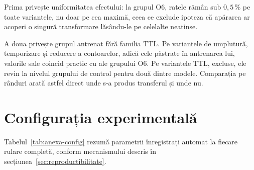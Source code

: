 Prima privește uniformitatea efectului: la grupul O6, ratele rămân sub $0{,}5\,\%$ pe toate variantele, nu doar pe cea maximă, ceea ce exclude ipoteza că apărarea ar acoperi o singură transformare lăsându-le pe celelalte neatinse.

A doua privește grupul antrenat fără familia TTL. Pe variantele de umplutură, temporizare și reducere a contoarelor, adică cele păstrate în antrenarea lui, valorile sale coincid practic cu ale grupului O6. Pe variantele TTL, excluse, ele revin la nivelul grupului de control pentru două dintre modele. Comparația pe rânduri arată astfel direct unde s-a produs transferul și unde nu.



\section{Configurația experimentală}\label{sec:anexa-config}

Tabelul~\ref{tab:anexa-config} rezumă parametrii înregistrați automat la fiecare rulare completă, conform mecanismului descris în secțiunea~\ref{sec:reproductibilitate}.

